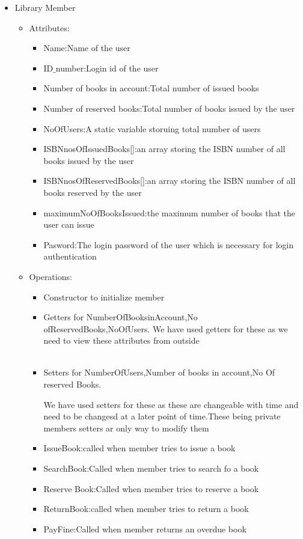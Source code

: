 \documentclass{article}
\begin{document}
\begin{itemize}
\item Library Member 
\begin{itemize}
\item Attributes:
\begin{itemize}
\item Name:Name of the user
\item ID$\_$number:Login id of the user
\item Number of books in account:Total number of issued books
\item Number of reserved books:Total number of books issued by the user
\item NoOfUsers:A static variable storuing total number of users
\item ISBNnosOfIssuedBooks[]:an array storing the ISBN number of all books issued by the user
\item ISBNnosOfReservedBooks[]:an array storing the ISBN number of all books reserved by the user
\item maximumNoOfBooksIssued:the maximum number of books that the user can issue
\item Pasword:The login password of the user which is necessary for login authentication
\end{itemize}

\item Operations:
\begin{itemize}

\item Constructor to initialize member\\
\item Getters for NumberOfBooksinAccount,No ofReservedBooks,NoOfUsers.
We have used getters for these as we need to view these attributes from outside \\\
\item Setters for NumberOfUsers,Number of books in account,No Of reserved Books.


We have used setters for these as these are changeable with time and need to be changesd at a later point of time.These being private members setters ar only way to modify them
\\
\item IssueBook:called when member tries to issue a book\\
\item SearchBook:Called when member tries to search fo a book\\
\item Reserve Book:Called when member tries to reserve a book\\
\item ReturnBook:called when member tries to return a book\\
\item PayFine:Called when member returns an overdue book\\


\end{itemize}
\end{itemize}
\end{itemize}
\end{document}
